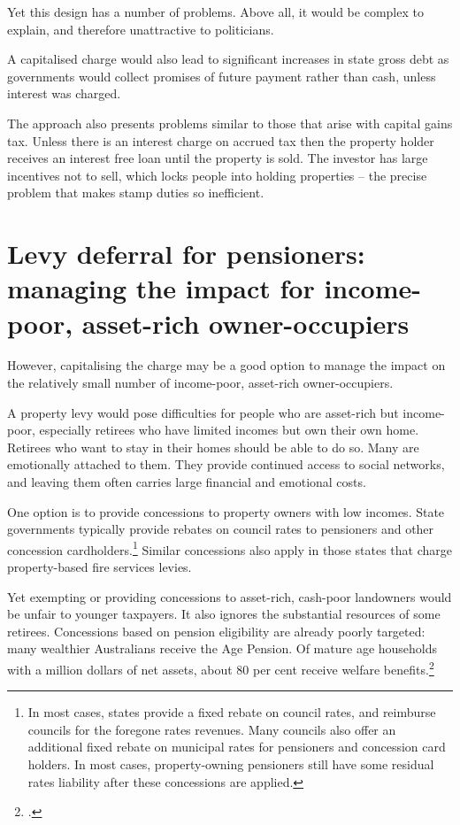 Yet this design has a number of problems. Above all, it would be complex to explain, and therefore unattractive to politicians. 

A capitalised charge would also lead to significant increases in state gross debt as governments would collect promises of future payment rather than cash, unless interest was charged. 

The approach also presents problems similar to those that arise with capital gains tax. Unless there is an interest charge on accrued tax then the property holder receives an interest free loan until the property is sold. The investor has large incentives not to sell, which locks people into holding properties – the precise problem that makes stamp duties so inefficient. 

\section{Levy deferral for pensioners: managing the impact for income-poor, asset-rich owner-occupiers\label{sec:PROP-6-5}}
However, capitalising the charge may be a good option to manage the impact on the relatively small number of income-poor, asset-rich owner-occupiers.

A property levy would pose difficulties for people who are asset-rich but income-poor, especially retirees who have limited incomes but own their own home. Retirees who want to stay in their homes should be able to do so. Many are emotionally attached to them. They provide continued access to social networks, and leaving them often carries large financial and emotional costs. 

One option is to provide concessions to property owners with low incomes. State governments typically provide rebates on council rates to pensioners and other concession cardholders.\footnote{In most cases, states provide a fixed rebate on council rates, and reimburse councils for the foregone rates revenues. Many councils also offer an additional fixed rebate on municipal rates for pensioners and concession card holders. In most cases, property-owning pensioners still have some residual rates liability after these concessions are applied.}  Similar concessions also apply in those states that charge property-based fire services levies. 

Yet exempting or providing concessions to asset-rich, cash-poor landowners would be unfair to younger taxpayers. It also ignores the substantial resources of some retirees. Concessions based on pension eligibility are already poorly targeted: many wealthier Australians receive the Age Pension. Of mature age households with a million dollars of net assets, about 80 per cent receive welfare benefits.\footcite[][37]{DaleyMcGannonSavageEtAl2013BalancingBudgets}  


